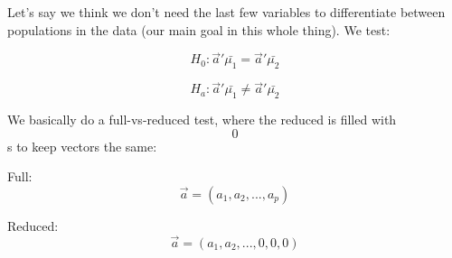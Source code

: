 Let's say we think we don't need the last few variables to differentiate
between populations in the data (our main goal in this whole thing). We
test:

\[H_0: \vec{a}'\bar{\mu_1} = \vec{a}'\bar{\mu_2}\]

\[H_a: \vec{a}'\bar{\mu_1} \ne \vec{a}'\bar{\mu_2}\]

We basically do a full-vs-reduced test, where the reduced is filled with
\[0\]s to keep vectors the same:

Full: \[\vec{a} = (a_1, a_2, ..., a_p)\]

Reduced: \[\vec{a} = (a_1, a_2, ..., 0, 0, 0)\]
